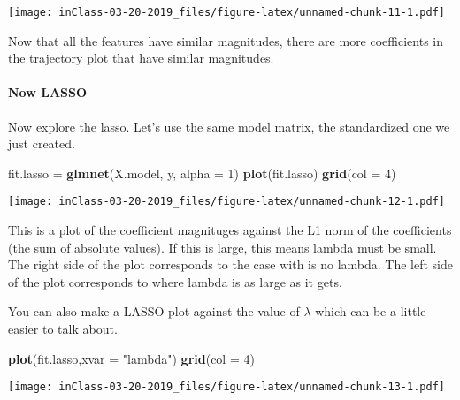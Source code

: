 \documentclass[]{article}
\newenvironment{Shaded}{\begin{snugshade}}{\end{snugshade}}
\newcommand{\KeywordTok}[1]{\textcolor[rgb]{0.13,0.29,0.53}{\textbf{{#1}}}}
\newcommand{\DataTypeTok}[1]{\textcolor[rgb]{0.13,0.29,0.53}{{#1}}}
\newcommand{\DecValTok}[1]{\textcolor[rgb]{0.00,0.00,0.81}{{#1}}}
\newcommand{\StringTok}[1]{\textcolor[rgb]{0.31,0.60,0.02}{{#1}}}
\newcommand{\CommentTok}[1]{\textcolor[rgb]{0.56,0.35,0.01}{\textit{{#1}}}}
\newcommand{\NormalTok}[1]{{#1}}
\let\oldparagraph\paragraph
\renewcommand{\paragraph}[1]{\oldparagraph{#1}\mbox{}}
\begin{document}
\texttt{[image: inClass-03-20-2019\_files/figure-latex/unnamed-chunk-11-1.pdf]}

Now that all the features have similar magnitudes, there are more
coefficients in the trajectory plot that have similar magnitudes.

\paragraph{Now LASSO}\label{now-lasso}

Now explore the lasso. Let's use the same model matrix, the standardized
one we just created.

\begin{Shaded}
\begin{Highlighting}[]
\NormalTok{fit.lasso =}\StringTok{ }\KeywordTok{glmnet}\NormalTok{(X.model, y, }\DataTypeTok{alpha =} \DecValTok{1}\NormalTok{)}
\KeywordTok{plot}\NormalTok{(fit.lasso)}
\KeywordTok{grid}\NormalTok{(}\DataTypeTok{col =} \DecValTok{4}\NormalTok{)}
\end{Highlighting}
\end{Shaded}

\texttt{[image: inClass-03-20-2019\_files/figure-latex/unnamed-chunk-12-1.pdf]}

This is a plot of the coefficient magnituges against the L1 norm of the
coefficients (the sum of absolute values). If this is large, this means
lambda must be small. The right side of the plot corresponds to the case
with is no lambda. The left side of the plot corresponds to where lambda
is as large as it gets.

You can also make a LASSO plot against the value of \(\lambda\) which
can be a little easier to talk about.

\begin{Shaded}
\begin{Highlighting}[]
\KeywordTok{plot}\NormalTok{(fit.lasso,}\DataTypeTok{xvar =} \StringTok{"lambda"}\NormalTok{)}
\KeywordTok{grid}\NormalTok{(}\DataTypeTok{col =} \DecValTok{4}\NormalTok{)}
\end{Highlighting}
\end{Shaded}

\texttt{[image: inClass-03-20-2019\_files/figure-latex/unnamed-chunk-13-1.pdf]}

\begin{Shaded}
\end{Shaded}
\end{document}
